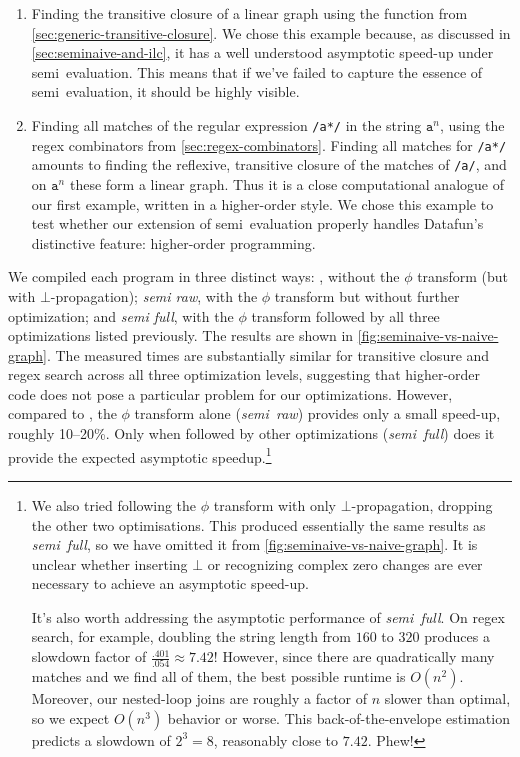 \begin{enumerate}
\item Finding the transitive closure of a linear graph using the 
  function from \cref{sec:generic-transitive-closure}. We chose this example
  because, as discussed in \cref{sec:seminaive-and-ilc}, it has a well
  understood asymptotic speed-up under semi\naive\ evaluation. This means that
  if we've failed to capture the essence of semi\naive\ evaluation, it should be
  highly visible.

\item Finding all matches of the regular expression \texttt{/a*/} in the string
  $\texttt{a}^n$, using the regex combinators from \cref{sec:regex-combinators}.
  Finding all matches for \texttt{/a*/} amounts to finding the reflexive,
  transitive closure of the matches of \texttt{/a/}, and on $\texttt{a}^n$ these
  form a linear graph. Thus it is a close computational analogue of our first
  example, written in a higher-order style. We chose this example to test
  whether our extension of semi\naive\ evaluation properly handles Datafun's
  distinctive feature: higher-order programming.
\end{enumerate}

We compiled each program in three distinct ways: \emph{\naive{}}, without the
$\phi$ transform (but with $\bot$-propagation); \emph{semi\naive{} raw}, with
the $\phi$ transform but without further optimization; and \emph{semi\naive{}
  full}, with the $\phi$ transform followed by all three optimizations listed
previously. The results are shown in \cref{fig:seminaive-vs-naive-graph}.
%
The measured times are substantially similar for transitive closure and regex
search across all three optimization levels, suggesting that higher-order code
does not pose a particular problem for our optimizations. However, compared to
\emph{\naive}, the $\phi$ transform alone (\emph{semi\naive\ raw}) provides only
a small speed-up, roughly 10--20\%. Only when followed by other optimizations
(\emph{semi\naive\ full}) does it provide the expected asymptotic
speedup.\footnote{We also tried following the $\phi$ transform with only
  $\bot$-propagation, dropping the other two optimisations. This produced
  essentially the same results as \emph{semi\naive\ full}, so we have omitted it
  from \cref{fig:seminaive-vs-naive-graph}. It is unclear whether inserting
  $\bot$ or recognizing complex zero changes are ever necessary to achieve an
  asymptotic speed-up.

  It's also worth addressing the asymptotic performance of
  \emph{semi\naive\ full}. On regex search, for example, doubling the string
  length from $160$ to $320$ produces a slowdown factor of $\frac{.401}{.054}
  \approx 7.42$! However, since there are quadratically many matches and we find
  all of them, the best possible runtime is $O(n^2)$. Moreover, our nested-loop
  joins are roughly a factor of $n$ slower than optimal, so we expect $O(n^3)$
  behavior or worse. This back-of-the-envelope estimation predicts a slowdown of
  $2^3 = 8$, reasonably close to $7.42$. Phew!}

